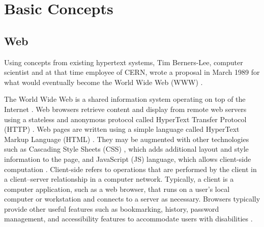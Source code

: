 \chapter{Basic Concepts} %
\label{cha:basic_concepts}
%
%
\section{Web} %
\label{sec:basic_concepts:web}

Using concepts from existing hypertext systems, Tim Berners-Lee, computer scientist and at that time employee of CERN, wrote a proposal in March 1989 for what would eventually become the World Wide Web (WWW) \cite{WC2006}.

The World Wide Web is a shared information system operating on top of the Internet \cite{WC2006}. Web browsers retrieve content and display from remote web servers using a stateless and anonymous protocol called HyperText Transfer Protocol (HTTP) \cite{WC2006}. Web pages are written using a simple language called HyperText Markup Language (HTML) \cite{WC2006}. They may be augmented with other technologies such as Cascading Style Sheets (CSS) \cite{CSS2013}, which adds additional layout and style information to the page, and JavaScript (JS) language, which allows client-side computation \cite{WC2006}. Client-side refers to operations that are performed by the client in a client–server relationship in a computer network. Typically, a client is a computer application, such as a web browser, that runs on a user's local computer or workstation and connects to a server as necessary. Browsers typically provide other useful features such as bookmarking, history, password management, and accessibility features to accommodate users with disabilities \cite{Grosskurth2005}.

